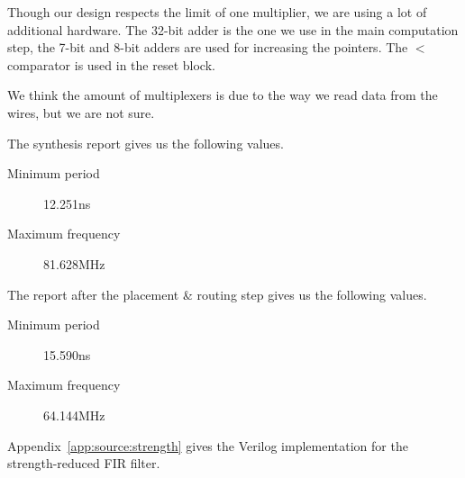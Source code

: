 Though our design respects the limit of one multiplier, we are using a lot of additional hardware.
The 32-bit adder is the one we use in the main computation step, the 7-bit and 8-bit adders are used for increasing the pointers.
The $<$ comparator is used in the reset block.

We think the amount of multiplexers is due to the way we read data from the wires, but we are not sure.

The synthesis report gives us the following values.
\begin{description}
	\item[Minimum period] 12.251ns
	\item[Maximum frequency] 81.628MHz
\end{description}

The report after the placement \& routing step gives us the following values.
\begin{description}
	\item[Minimum period] 15.590ns
	\item[Maximum frequency] 64.144MHz
\end{description}

\strengthfilter
Appendix~\ref{app:source:strength} gives the Verilog implementation for the strength-reduced FIR filter.
